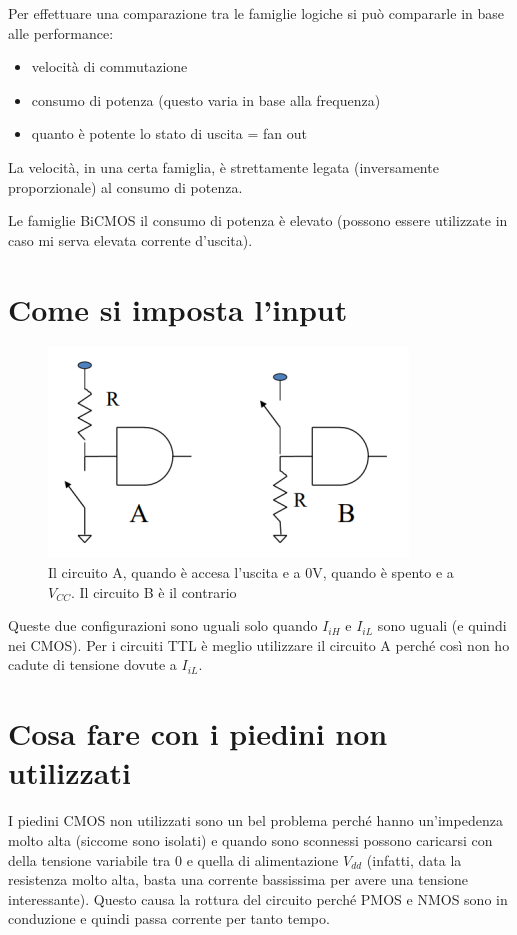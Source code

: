 \documentclass[
]{book}
\providecommand{\tightlist}{%
  \setlength{\itemsep}{0pt}\setlength{\parskip}{0pt}}
\begin{document}
Per effettuare una comparazione tra le famiglie logiche si può
compararle in base alle performance:

\begin{itemize}
\tightlist
\item
  velocità di commutazione
\item
  consumo di potenza (questo varia in base alla frequenza)
\item
  quanto è potente lo stato di uscita = fan out
\end{itemize}

La velocità, in una certa famiglia, è strettamente legata (inversamente
proporzionale) al consumo di potenza.

Le famiglie BiCMOS il consumo di potenza è elevato (possono essere
utilizzate in caso mi serva elevata corrente d'uscita).

\section{Come si imposta l'input}\label{come-si-imposta-linput}

\begin{figure}
\centering
\includegraphics[width=0.4\linewidth,height=\textheight,keepaspectratio]{immagini/34.png}
\caption{Il circuito A, quando è accesa l'uscita e a 0V, quando è spento
e a \(V_{CC}\). Il circuito B è il contrario}
\end{figure}

Queste due configurazioni sono uguali solo quando \(I_{iH}\) e
\(I_{iL}\) sono uguali (e quindi nei CMOS). Per i circuiti TTL è meglio
utilizzare il circuito A perché così non ho cadute di tensione dovute a
\(I_{iL}\).

\section{Cosa fare con i piedini non
utilizzati}\label{cosa-fare-con-i-piedini-non-utilizzati}

I piedini CMOS non utilizzati sono un bel problema perché hanno
un'impedenza molto alta (siccome sono isolati) e quando sono sconnessi
possono caricarsi con della tensione variabile tra 0 e quella di
alimentazione \(V_{dd}\) (infatti, data la resistenza molto alta, basta
una corrente bassissima per avere una tensione interessante). Questo
causa la rottura del circuito perché PMOS e NMOS sono in conduzione e
quindi passa corrente per tanto tempo.
\end{document}
